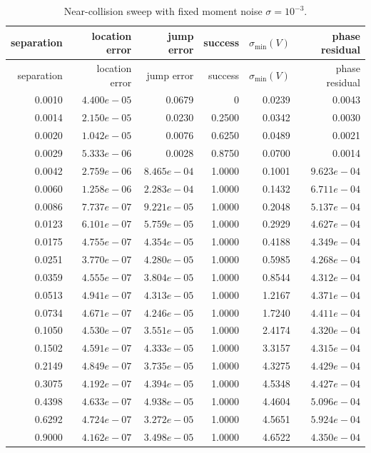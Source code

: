 {\scriptsize\setlength{\tabcolsep}{3pt}
\begin{longtable}{rrrrrr}
\caption{Near-collision sweep with fixed moment noise $\sigma=10^{-3}$.}\label{tab:separation}\\
\toprule
separation & location error & jump error & success & $\sigma_{\min}(V)$ & phase residual\\
\midrule\endfirsthead
\toprule separation & location error & jump error & success & $\sigma_{\min}(V)$ & phase residual\\\midrule\endhead
0.0010 & $4.400e-05$ & 0.0679 & 0 & 0.0239 & 0.0043\\
0.0014 & $2.150e-05$ & 0.0230 & 0.2500 & 0.0342 & 0.0030\\
0.0020 & $1.042e-05$ & 0.0076 & 0.6250 & 0.0489 & 0.0021\\
0.0029 & $5.333e-06$ & 0.0028 & 0.8750 & 0.0700 & 0.0014\\
0.0042 & $2.759e-06$ & $8.465e-04$ & 1.0000 & 0.1001 & $9.623e-04$\\
0.0060 & $1.258e-06$ & $2.283e-04$ & 1.0000 & 0.1432 & $6.711e-04$\\
0.0086 & $7.737e-07$ & $9.221e-05$ & 1.0000 & 0.2048 & $5.137e-04$\\
0.0123 & $6.101e-07$ & $5.759e-05$ & 1.0000 & 0.2929 & $4.627e-04$\\
0.0175 & $4.755e-07$ & $4.354e-05$ & 1.0000 & 0.4188 & $4.349e-04$\\
0.0251 & $3.770e-07$ & $4.280e-05$ & 1.0000 & 0.5985 & $4.268e-04$\\
0.0359 & $4.555e-07$ & $3.804e-05$ & 1.0000 & 0.8544 & $4.312e-04$\\
0.0513 & $4.941e-07$ & $4.313e-05$ & 1.0000 & 1.2167 & $4.371e-04$\\
0.0734 & $4.671e-07$ & $4.246e-05$ & 1.0000 & 1.7240 & $4.411e-04$\\
0.1050 & $4.530e-07$ & $3.551e-05$ & 1.0000 & 2.4174 & $4.320e-04$\\
0.1502 & $4.591e-07$ & $4.333e-05$ & 1.0000 & 3.3157 & $4.315e-04$\\
0.2149 & $4.849e-07$ & $3.735e-05$ & 1.0000 & 4.3275 & $4.429e-04$\\
0.3075 & $4.192e-07$ & $4.394e-05$ & 1.0000 & 4.5348 & $4.427e-04$\\
0.4398 & $4.633e-07$ & $4.938e-05$ & 1.0000 & 4.4604 & $5.096e-04$\\
0.6292 & $4.724e-07$ & $3.272e-05$ & 1.0000 & 4.5651 & $5.924e-04$\\
0.9000 & $4.162e-07$ & $3.498e-05$ & 1.0000 & 4.6522 & $4.350e-04$\\
\bottomrule
\end{longtable}
}